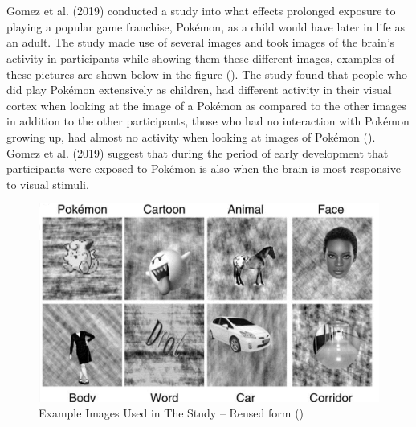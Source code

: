 \\\\
Gomez et al. (2019) conducted a study into what effects prolonged exposure to playing a popular game franchise, Pokémon, as a child would have later in life as an adult. The study made use of several images and took images of the brain’s activity in participants while showing them these different images, examples of these pictures are shown below in the figure (\cite{Gomez2019}). The study found that people who did play Pokémon extensively as children, had different activity in their visual cortex when looking at the image of a Pokémon as compared to the other images in addition to the other participants, those who had no interaction with Pokémon growing up, had almost no activity when looking at images of Pokémon (\cite{Gomez2019}). Gomez et al. (2019) suggest that during the period of early development that participants were exposed to Pokémon is also when the brain is most responsive to visual stimuli.

\begin{figure}[H]
\centering
\centerline{\includegraphics[scale=0.5]{Figures/poke.png}}
\caption{Example Images Used in The Study – Reused form (\cite{Gomez2019})}
\end{figure}


